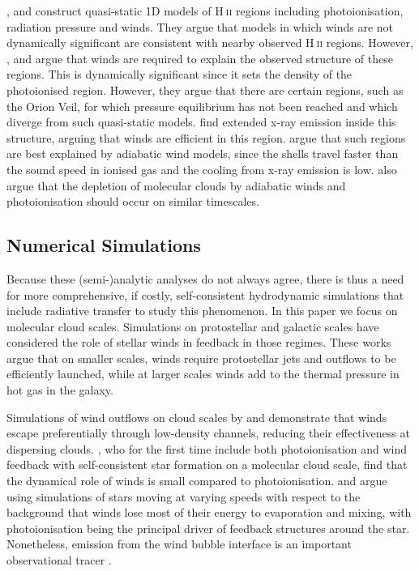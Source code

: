 \documentclass[a4paper,fleqn,usenatbib]{mnras}
\newcommand{\HII}{H$~$\textsc{ii}\xspace}
\begin{document}
\cite{Harper-Clark2009}, \cite{Yeh2012} and \cite{Yeh2013} construct quasi-static 1D models of \HII regions including photoionisation, radiation pressure and winds. They argue that models in which winds are not dynamically significant are consistent with nearby observed \HII regions. However, \cite{Pellegrini2007}, \cite{Pellegrini2011} and \cite{Pellegrini2012} argue that winds are required to explain the observed structure of these regions. This is dynamically significant since it sets the density of the photoionised region. However, they argue that there are certain regions, such as the Orion Veil, for which pressure equilibrium has not been reached and which diverge from such quasi-static models. \cite{Guedel2007} find extended x-ray emission inside this structure, arguing that winds are efficient in this region. \cite{Pabst2019} argue that such regions are best explained by adiabatic wind models, since the shells travel faster than the sound speed in ionised gas and the cooling from x-ray emission is low. \cite{Kruijssen2019} also argue that the depletion of molecular clouds by adiabatic winds and photoionisation should occur on similar timescales. 

\subsection{Numerical Simulations}

Because these (semi-)analytic analyses do not always agree, there is thus a need for more comprehensive, if costly, self-consistent hydrodynamic simulations that include radiative transfer to study this phenomenon. In this paper we focus on molecular cloud scales. Simulations on protostellar \citep[e.g.][]{Kuiper2018} \ISM \citep[e.g][]{Gatto2017} and galactic \citep[e.g.][]{Agertz2013} scales have considered the role of stellar winds in feedback in those regimes. These works argue that on smaller scales, winds require protostellar jets and outflows to be efficiently launched, while at larger scales winds add to the thermal pressure in hot gas in the galaxy. 

Simulations of wind outflows on cloud scales by \cite{Rogers2013} and \cite{Rey-Raposo2017} demonstrate that winds escape preferentially through low-density channels, reducing their effectiveness at dispersing clouds. \cite{Dale2014}, who for the first time include both photoionisation and wind feedback with self-consistent star formation on a molecular cloud scale, find that the dynamical role of winds is small compared to photoionisation. \cite{Mackey2013} and \cite{Mackey2015} argue using simulations of stars moving at varying speeds with respect to the background that winds lose most of their energy to evaporation and mixing, with photoionisation being the principal driver of feedback structures around the star. Nonetheless, emission from the wind bubble interface is an important observational tracer \citep{Green2019}.
\end{document}
